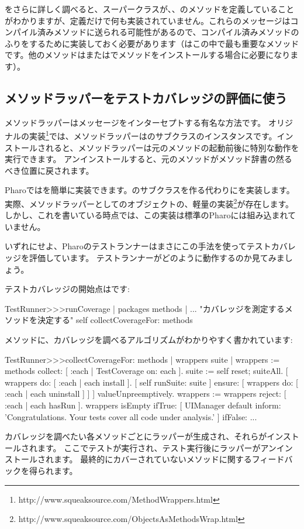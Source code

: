 \documentclass[a4paper,10pt,twoside]{book}
\begin{document}
をさらに詳しく調べると、スーパークラスが、、のメソッドを定義していることがわかりますが、定義だけで何も実装されていません。これらのメッセージはコンパイル済みメソッドに送られる可能性があるので、コンパイル済みメソッドのふりをするために実装しておく必要があります（はこの中で最も重要なメソッドです。他のメソッドはまたはでメソッドをインストールする場合に必要になります）。

\subsection{メソッドラッパーをテストカバレッジの評価に使う}

メソッドラッパーはメッセージをインターセプトする有名な方法です\cite{Bran98a}。
オリジナルの実装\footnote{http://www.squeaksource.com/MethodWrappers.html}では、メソッドラッパーはのサブクラスのインスタンスです。インストールされると、メソッドラッパーは元のメソッドの起動前後に特別な動作を実行できます。
アンインストールすると、元のメソッドがメソッド辞書の然るべき位置に戻されます。

Pharoではを簡単に実装できます。のサブクラスを作る代わりにを実装します。実際、メソッドラッパーとしてのオブジェクトの、軽量の実装\footnote{http://www.squeaksource.com/ObjectsAsMethodsWrap.html}が存在します。しかし、これを書いている時点では、この実装は標準のPharoには組み込まれていません。

いずれにせよ、Pharoのテストランナーはまさにこの手法を使ってテストカバレッジを評価しています。
テストランナーがどのように動作するのか見てみましょう。

テストカバレッジの開始点はです:
\begin{code}{}
TestRunner>>>runCoverage
	| packages methods |
	... "カバレッジを測定するメソッドを決定する"
	self collectCoverageFor: methods
\end{code}

メソッドに、カバレッジを調べるアルゴリズムがわかりやすく書かれています:
\begin{code}{}
TestRunner>>>collectCoverageFor: methods
	| wrappers suite |
	wrappers := methods collect: [ :each | TestCoverage on: each ].
	suite := self
		reset;
		suiteAll.
	[ wrappers do: [ :each | each install ].
	  [ self runSuite: suite ] ensure: [ wrappers do: [ :each | each uninstall ] ] ] valueUnpreemptively.
	wrappers := wrappers reject: [ :each | each hasRun ].
	wrappers isEmpty 
		ifTrue: 
			[ UIManager default inform: 'Congratulations. Your tests cover all code under analysis.' ]
		ifFalse: ...
\end{code}
カバレッジを調べたい各メソッドごとにラッパーが生成され、それらがインストールされます。
ここでテストが実行され、テスト実行後にラッパーがアンインストールされます。
最終的にカバーされていないメソッドに関するフィードバックを得られます。
\end{document}
